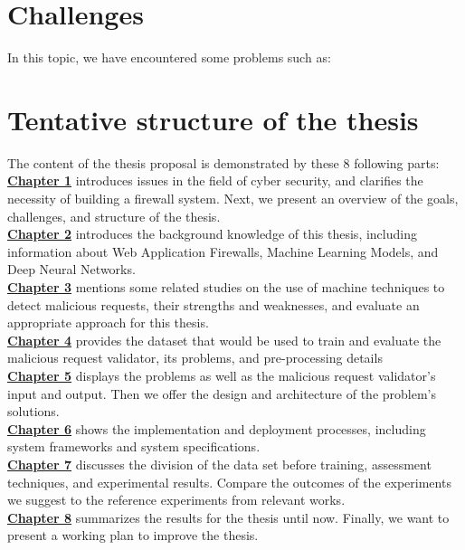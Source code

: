 \section{Challenges}
\label{sec:challenges}
In this topic, we have encountered some problems such as:
\section{Tentative structure of the thesis}
\label{sec:structure}
	\newcommand\nextintro{\\[4mm]}
	The content of the thesis proposal is demonstrated by these 8 following parts: \nextintro
	\hyperref[chap:introduction]{\textbf{Chapter 1}} introduces issues in the field of cyber security, and clarifies the necessity of building a firewall system. Next, we present an overview of the goals, challenges, and structure of the thesis.\nextintro
	\hyperref[chap:backgrounds]{\textbf{Chapter 2}} introduces the background knowledge of this thesis, including information about Web Application Firewalls, Machine Learning Models, and Deep Neural Networks.\nextintro
	\hyperref[chap:literaturereview]{\textbf{Chapter 3}} mentions some related studies on the use of machine techniques to detect malicious requests, their strengths and weaknesses, and evaluate an appropriate approach for this thesis.\nextintro
	\hyperref[chap:dataset]{\textbf{Chapter 4}} provides the dataset that would be used to train and evaluate the malicious request validator, its problems, and pre-processing details\nextintro
	\hyperref[chap:proposed_approach]{\textbf{Chapter 5}} displays the problems as well as the malicious request validator's input and output. Then we offer the design and architecture of the problem's solutions.\nextintro
	\hyperref[chap:implementation]{\textbf{Chapter 6}} shows the implementation and deployment processes, including system frameworks and system specifications.\nextintro
	\newpage
	\hyperref[chap:experiments]{\textbf{Chapter 7}} discusses the division of the data set before training, assessment techniques, and experimental results. Compare the outcomes of the experiments we suggest to the reference experiments from relevant works.\nextintro
	\hyperref[chap:conclusion]{\textbf{Chapter 8}} summarizes the results for the thesis until now. Finally, we want to present a working plan to improve the thesis.\nextintro
